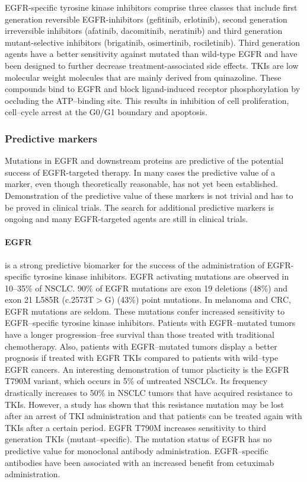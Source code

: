 {{      EGFR-specific tyrosine kinase inhibitors comprise three classes that
      include first generation reversible  EGFR-inhibitors (gefitinib,
      erlotinib), second generation irreversible inhibitors (afatinib,
      dacomitinib, neratinib) and third generation mutant-selective inhibitors
      (brigatinib, osimertinib, rociletinib). Third generation agents have a
      better sensitivity against mutated than wild-type EGFR and have been
      designed to further decrease treatment-associated side effects. TKIs
      are low molecular weight molecules that are mainly
      derived from quinazoline. These compounds bind to EGFR and block
      ligand-induced receptor phosphorylation by occluding the ATP--binding
      site. This results in inhibition of cell proliferation, cell--cycle arrest
      at the G0/G1 boundary and apoptosis.

    \subsubsection{Predictive markers}

      Mutations in EGFR and downstream proteins are predictive of the potential
      success of EGFR-targeted therapy. In many cases the predictive value of a
      marker, even though theoretically reasonable, has not yet been
      established. Demonstration of the predictive value of these markers is not
      trivial and has to be proved in clinical trials. The search for
      additional predictive markers is ongoing and many EGFR-targeted
      agents are still in clinical trials.

      \paragraph{EGFR} is a strong predictive biomarker for the success of the
      administration of EGFR-specific tyrosine kinase inhibitors. EGFR
      activating mutations are observed in 10--35\% of NSCLC. 90\% of EGFR
      mutations are exon 19 deletions (48\%) and exon 21 L585R (c.2573T$>$G)
      (43\%) point mutations. In melanoma and CRC, EGFR mutations are seldom.
      These mutations confer increased sensitivity to EGFR--specific tyrosine
      kinase inhibitors. Patients with EGFR--mutated tumors have a longer
      progression--free survival than those treated with traditional
      chemotherapy. Also, patients with EGFR--mutated tumors display a better
      prognosis if treated with EGFR TKIs compared to patients with wild--type EGFR
      cancers. An interesting demonstration of tumor placticity is the EGFR
      T790M variant, which occurs in 5\% of untreated NSCLCs. Its frequency
      drastically increases to 50\% in NSCLC tumors that have acquired
      resistance to TKIs. However, a study has shown that this resistance
      mutation may be lost after an arrest of TKI administration and that
      patients can be treated again with TKIs after a certain period. EGFR
      T790M increases sensitivity to third generation TKIs (mutant--specific).
      The mutation status of EGFR has no predictive value for monoclonal
      antibody administration. EGFR--specific antibodies have been associated
      with an increased benefit from cetuximab administration.

}}
